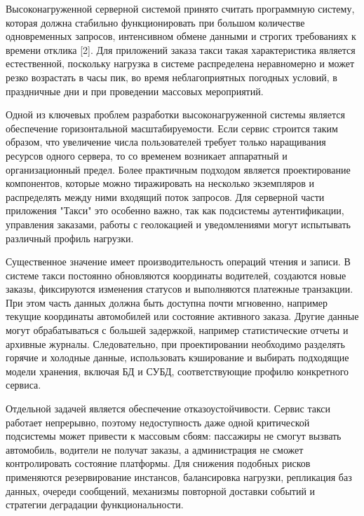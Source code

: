 {\gostFont
	
	\par \redline Высоконагруженной серверной системой принято считать программную систему, которая должна стабильно функционировать при большом количестве одновременных запросов, интенсивном обмене данными и строгих требованиях к времени отклика [2]. Для приложений заказа такси такая характеристика является естественной, поскольку нагрузка в системе распределена неравномерно и может резко возрастать в часы пик, во время неблагоприятных погодных условий, в праздничные дни и при проведении массовых мероприятий.
	
	\par \redline Одной из ключевых проблем разработки высоконагруженной системы является обеспечение горизонтальной масштабируемости. Если сервис строится таким образом, что увеличение числа пользователей требует только наращивания ресурсов одного сервера, то со временем возникает аппаратный и организационный предел. Более практичным подходом является проектирование компонентов, которые можно тиражировать на несколько экземпляров и распределять между ними входящий поток запросов. Для серверной части приложения "Такси"{} это особенно важно, так как подсистемы аутентификации, управления заказами, работы с геолокацией и уведомлениями могут испытывать различный профиль нагрузки.
	
	\par \redline Существенное значение имеет производительность операций чтения и записи. В системе такси постоянно обновляются координаты водителей, создаются новые заказы, фиксируются изменения статусов и выполняются платежные транзакции. При этом часть данных должна быть доступна почти мгновенно, например текущие координаты автомобилей или состояние активного заказа. Другие данные могут обрабатываться с большей задержкой, например статистические отчеты и архивные журналы. Следовательно, при проектировании необходимо разделять горячие и холодные данные, использовать кэширование и выбирать подходящие модели хранения, включая БД и СУБД, соответствующие профилю конкретного сервиса.
	
	\par \redline Отдельной задачей является обеспечение отказоустойчивости. Сервис такси работает непрерывно, поэтому недоступность даже одной критической подсистемы может привести к массовым сбоям: пассажиры не смогут вызвать автомобиль, водители не получат заказы, а администрация не сможет контролировать состояние платформы. Для снижения подобных рисков применяются резервирование инстансов, балансировка нагрузки, репликация баз данных, очереди сообщений, механизмы повторной доставки событий и стратегии деградации функциональности.
	
}
